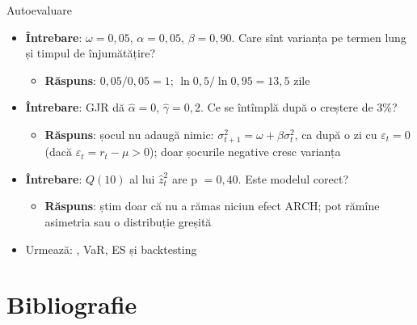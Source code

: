 \begin{frame}{Autoevaluare}
\itemsize{\small}
\begin{itemize}
    \item \textbf{Întrebare}: $\omega = 0{,}05$, $\alpha = 0{,}05$, $\beta = 0{,}90$. Care sînt varianța pe termen lung și timpul de înjumătățire?
    \begin{itemize}
        \item \textbf{Răspuns}: $0{,}05/0{,}05 = 1$; $\ln 0{,}5/\ln 0{,}95 = 13{,}5$ zile
    \end{itemize}
    \item \textbf{Întrebare}: GJR dă $\hat\alpha = 0$, $\hat\gamma = 0{,}2$. Ce se întîmplă după o creștere de 3\%?
    \begin{itemize}
        \item \textbf{Răspuns}: șocul nu adaugă nimic: $\sigma_{t+1}^2 = \omega + \beta\sigma_t^2$, ca după o zi cu $\varepsilon_t = 0$ (dacă $\varepsilon_t = r_t - \mu > 0$); doar șocurile negative cresc varianța
    \end{itemize}
    \item \textbf{Întrebare}: $Q(10)$ al lui $\hat z_t^2$ are p $= 0{,}40$. Este modelul corect?
    \begin{itemize}
        \item \textbf{Răspuns}: știm doar că nu a rămas niciun efect ARCH; pot rămîne asimetria sau o distribuție greșită
    \end{itemize}
    \item Urmează: , VaR, ES și backtesting
\end{itemize}
\end{frame}


\section{Bibliografie}

